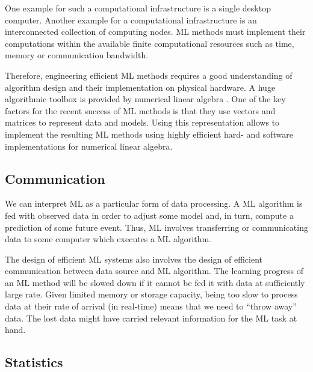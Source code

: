 \documentclass[12pt]{report}
\begin{document}
One example for such a computational infrastructure is a single 
desktop computer. Another example for a computational infrastructure 
is an interconnected collection of computing nodes. ML methods 
must implement their computations within the available finite computational 
resources such as time, memory or communication bandwidth.  

Therefore, engineering efficient ML methods requires a good understanding of algorithm 
design and their implementation on physical hardware. A huge algorithmic toolbox is provided 
by numerical linear algebra \cite{StrangLinAlg2016,Strang2007}. One of the key factors for the 
recent success of ML methods is that they use vectors and matrices to represent data and 
models. Using this representation allows to implement the resulting ML methods using highly 
efficient hard- and software implementations for numerical linear algebra. 


\subsection{Communication} 

We can interpret ML as a particular form of data processing. 
A ML algorithm is fed with observed data in order to adjust 
some model and, in turn, compute a prediction of some future 
event. Thus, ML involves transferring or communicating 
data to some computer which executes a ML algorithm. 

The design of efficient ML systems also involves the design 
of efficient communication between data source and ML algorithm. 
The learning progress of an ML method will be slowed down 
if it cannot be fed it with data at sufficiently large rate. Given 
limited memory or storage capacity, being too slow to process 
data at their rate of arrival (in real-time) means that we need to 
``throw away'' data. The lost data might have carried relevant 
information for the ML task at hand. 



\subsection{Statistics}

\end{document}

